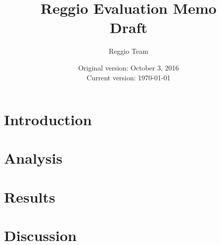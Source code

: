 






\title{\Large \textbf{Reggio Evaluation Memo} \\ Draft}
\author{\normalsize Reggio Team}
\date{\normalsize Original version: October 3, 2016 \\ Current version: \today}
\maketitle

\doublespacing

\section{Introduction}
\label{sec:introduction}


\section{Analysis}
\label{sec:methodology}



\section{Results}
\label{sec:result}


\section{Discussion}
\label{sec:discussion}


\clearpage






